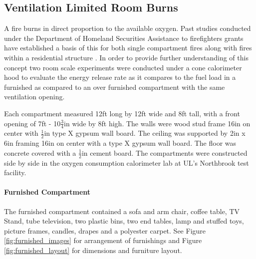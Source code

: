 \documentclass{article}
\begin{document}
\subsection{Ventilation Limited Room Burns}
A fire burns in direct proportion to the available oxygen. Past studies conducted under the Department of Homeland Securities Assistance to firefighters grants have established a basis of this for both single compartment fires along with fires within a residential structure \cite{DHS2008} \cite{DHS2010}. In order to provide further understanding of this concept two room scale experiments were conducted under a cone calorimeter hood to evaluate the energy release rate as it compares to the fuel load in a furnished as compared to an over furnished compartment with the same ventilation opening.

Each compartment measured 12ft long by 12ft wide and 8ft tall, with a front opening of 7ft - 10$\frac{3}{4}$in wide by 8ft high. The walls were wood stud frame 16in on center with $\frac{1}{2}$in type X gypsum wall board. The ceiling was supported by 2in x 6in framing 16in on center with a type X gypsum wall board. The floor was concrete covered with a $\frac{1}{2}$in cement board. The compartments were constructed side by side in the oxygen consumption calorimeter lab at UL's Northbrook test facility. 

\paragraph{Furnished Compartment} \mbox{}

The furnished compartment contained a sofa and arm chair, coffee table, TV Stand, tube television, two plastic bins, two end tables, lamp and stuffed toys, picture frames, candles, drapes and a polyester carpet. See Figure \ref{fig:furnished_images} for arrangement of furnishings and Figure \ref{fig:furnished_layout} for dimensions and furniture layout.
\end{document}
